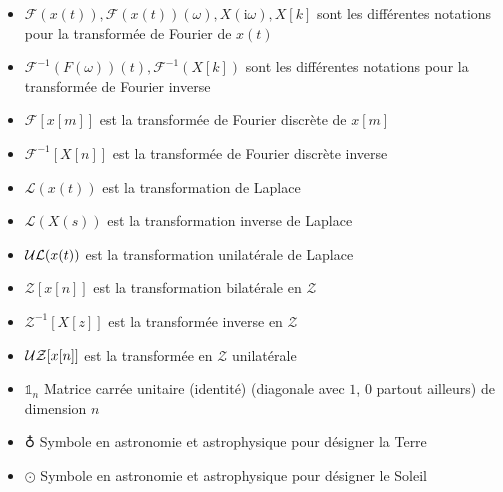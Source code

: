 \begin{itemize}[label={},leftmargin=0.5cm]
	 	\item $\mathcal{F}(x(t)), \mathcal{F}(x(t))(\omega), X(\mathrm{i}\omega), X[k]$ sont les différentes notations pour la transformée de Fourier de $x(t)$
	 	\item $\mathcal{F}^{-1}(F(\omega))(t), \mathcal{F}^{-1}(X[k])$ sont les différentes notations pour la transformée de Fourier inverse
	 	\item $\mathcal{F}[x[m]]$ est la transformée de Fourier discrète de $x[m]$
	 	\item $\mathcal{F}^{-1}[X[n]]$ est la transformée de Fourier discrète inverse
	 	\item $\mathcal{L}(x(t))$ est la transformation de Laplace
	 	\item $\mathcal{L}(X(s))$ est la transformation inverse de Laplace
	 	\item ${\cal UL}(x(t))$ est la transformation unilatérale de Laplace
	 	\item $\mathcal{Z}[x[n]]$ est la transformation bilatérale en $\mathcal{Z}$
	 	\item $\mathcal{Z}^{-1}[X[z]]$ est la transformée inverse en $\mathcal{Z}$
	 	\item ${\cal UZ}[x[n]]$ est la transformée en $\mathcal{Z}$ unilatérale
	 	\item $\mathds{1}_n$ Matrice carrée unitaire (identité) (diagonale avec $1$, $0$ partout ailleurs) de dimension $n$
	 	\item $\earth$ Symbole en astronomie et astrophysique pour désigner la Terre
	 	\item $\odot$ Symbole en astronomie et astrophysique pour désigner le Soleil
	\end{itemize}